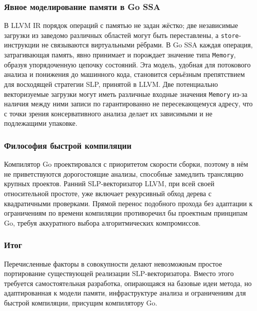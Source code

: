 \subsubsection{Явное моделирование памяти в Go SSA}

В LLVM IR порядок операций с памятью не задан жёстко; две независимые загрузки из заведомо различных областей могут быть переставлены,
а \texttt{store}-инструкции не связываются виртуальными рёбрами. В Go SSA каждая операция, затрагивающая память, явно принимает и порождает значение типа \texttt{Memory}, образуя упорядоченную цепочку состояний. Эта модель, удобная для потокового анализа и понижения до машинного кода, становится серьёзным препятствием для восходящей стратегии SLP, принятой в LLVM. Две потенциально векторизуемые загрузки могут иметь различные входные значения \texttt{Memory} из-за наличия между ними записи по гарантированно не пересекающемуся адресу, что с точки зрения консервативного анализа делает их зависимыми и не подлежащими упаковке.

\subsubsection{Философия быстрой компиляции}

Компилятор Go проектировался с приоритетом скорости сборки, поэтому в нём не приветствуются дорогостоящие анализы, 
способные замедлить трансляцию крупных проектов.
Ранний SLP-векторизатор LLVM, при всей своей относительной простоте, уже включает рекурсивный обход дерева
с квадратичными проверками. 
Прямой перенос подобного прохода без адаптации к ограничениям по времени компиляции противоречил бы проектным принципам Go,
требуя аккуратного выбора алгоритмических компромиссов.

\subsubsection{Итог}

Перечисленные факторы в совокупности делают невозможным простое портирование существующей реализации SLP-векторизатора.
Вместо этого требуется самостоятельная разработка, опирающаяся на базовые идеи метода, но адаптированная к модели памяти, 
инфраструктуре анализа и ограничениям для быстрой компиляции, присущим компилятору Go.
